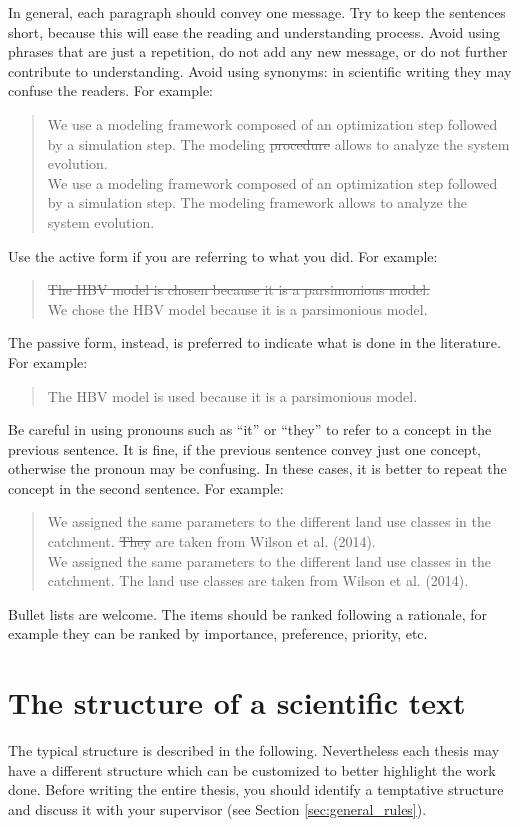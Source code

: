In general, each paragraph should convey one message. 
Try to keep the sentences short, because this will ease the reading and understanding process.
Avoid using phrases that are just a repetition, do not add any new message, or do not further contribute to understanding.
Avoid using synonyms: in scientific writing they may confuse the readers. 
For example: \\
\blockquote{We use a modeling framework composed of an optimization step followed by a simulation step. The modeling \sout{procedure} allows to analyze the system evolution.\\
We use a modeling framework composed of an optimization step followed by a simulation step. The modeling framework allows to analyze the system evolution.}

Use the active form if you are referring to what you did.
For example:
\blockquote{\sout{The HBV model is chosen because it is a parsimonious model.}\\
We chose the HBV model because it is a parsimonious model.}
The passive form, instead, is preferred to indicate what is done in the literature.
For example:
\blockquote{The HBV model is used because it is a parsimonious model.}

Be careful in using pronouns such as “it” or “they” to refer to a concept in the previous sentence. 
It is fine, if the previous sentence convey just one concept, otherwise the pronoun may be confusing.
In these cases, it is better to repeat the concept in the second sentence.
For example:
\blockquote{We assigned the same parameters to the different land use classes in the catchment. \sout{They} are taken from Wilson et al. (2014).\\
We assigned the same parameters to the different land use classes in the catchment. The land use classes are taken from Wilson et al. (2014).}

Bullet lists are welcome.
The items should be ranked following a rationale, for example they can be ranked by importance, preference, priority, etc.

\section{The structure of a scientific text}
The typical structure is described in the following.
Nevertheless each thesis may have a different structure which can be customized to better highlight the work done.
Before writing the entire thesis, you should identify a temptative structure and discuss it with your supervisor (see Section \ref{sec:general_rules}).

